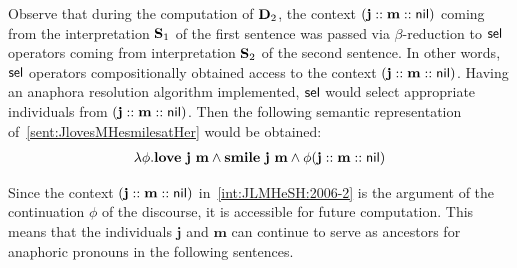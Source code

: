 
Observe that during the computation of $\D_2$, the context $(\textbf{j} :: \textbf{m}::\nil)$ coming from the interpretation $\S_1$ of the first sentence was passed via $\beta$-reduction to $\selK$ operators coming from interpretation $\S_2$ of the second sentence. In other words, $\selK$ operators compositionally obtained access to the context $(\textbf{j} :: \textbf{m}::\nil)$. Having an anaphora resolution algorithm implemented, $\selK$ would select appropriate individuals from $(\textbf{j} :: \textbf{m}::\nil)$. Then
the following semantic representation of~\eqref{sent:JlovesMHesmilesatHer} would be obtained: 
\begin{align}
\lambda \phi.\textbf{love} \  \textbf{j} \ \textbf{m} \land    \textbf{smile}  \ \textbf{j} \ \textbf{m} \land \phi   (\textbf{j} :: \textbf{m}::\nil) \label{int:JLMHeSH:2006-2}
\end{align}


Since the context $ (\textbf{j} :: \textbf{m}::\nil)$ in~\eqref{int:JLMHeSH:2006-2} is the argument of the continuation $\phi$ of the discourse, it is accessible for future computation. This means that the individuals $\textbf{j}$ and $\textbf{m}$ can continue to serve as ancestors for anaphoric pronouns in the following sentences. 
